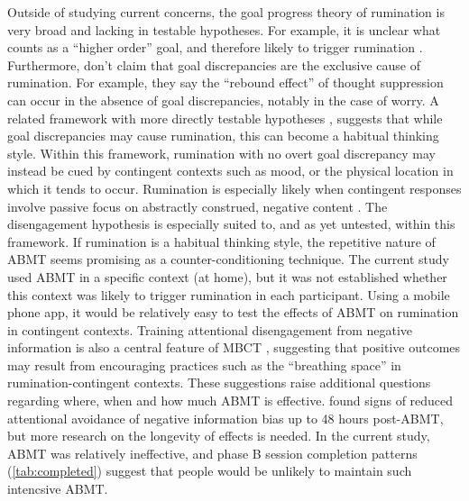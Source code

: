 \documentclass[man,floatsintext,a4paper,biblatex]{apa6}\usepackage[]{graphicx}\usepackage[]{color}
\begin{document}
Outside of studying current concerns, the goal progress theory of
rumination is very broad and lacking in testable hypotheses. For example,
it is unclear what counts as a ``higher order'' goal, and therefore likely
to trigger rumination \parencite{martin_ruminative_1996}.  Furthermore,
\textcite{martin_ruminative_1996} don't claim that goal discrepancies are
the exclusive cause of rumination. For example, they say the ``rebound
effect'' of thought suppression \parencite{wegner_paradoxical_1987}
can occur in the absence of goal discrepancies, notably in the case
of worry. A related framework with more directly testable hypotheses
\parencite{watkins_habitgoal_2014}, suggests that while goal discrepancies
may cause rumination, this can become a habitual thinking style. Within
this framework, rumination with no overt goal discrepancy may instead
be cued by contingent contexts such as mood, or the physical location
in which it tends to occur. Rumination is especially likely when
contingent responses involve passive focus on abstractly construed,
negative content \parencite{watkins_habitgoal_2014}. The disengagement
hypothesis \parencite{koster_understanding_2011} is especially suited
to, and as yet untested, within this framework. If rumination is a
habitual thinking style, the repetitive nature of ABMT seems promising
as a counter-conditioning technique. The current study used ABMT in a
specific context (at home), but it was not established whether this
context was likely to trigger rumination in each participant. Using
a mobile phone app, it would be relatively easy to test the effects
of ABMT on rumination in contingent contexts. Training attentional
disengagement from negative information is also a central feature of
MBCT \parencite{donaldson_rumination_2007}, suggesting that positive
outcomes may result from encouraging practices such as the ``breathing
space'' \parencite{segal_mindfulnessbased_2012} in rumination-contingent
contexts. These suggestions raise additional questions regarding where,
when and how much ABMT is effective. \textcite{see_reduction_2009} found
signs of reduced attentional avoidance of negative information bias up
to 48 hours post-ABMT, but more research on the longevity of effects
is needed. In the current study, ABMT was relatively ineffective, and
phase B session completion patterns (\cref{tab:completed}) suggest that
people would be unlikely to maintain such intencsive ABMT.
\end{document}
